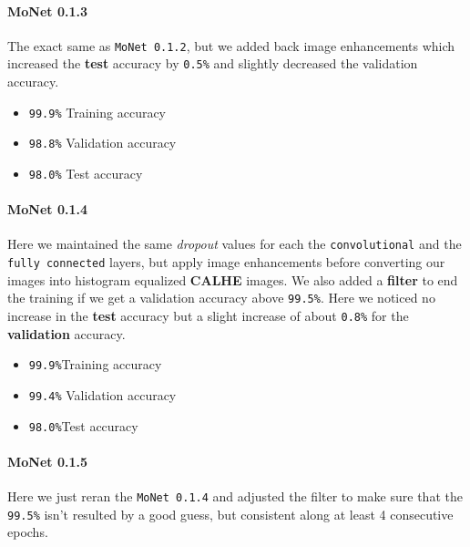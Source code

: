 \documentclass[11pt]{article}
\providecommand{\tightlist}{%
      \setlength{\itemsep}{0pt}\setlength{\parskip}{0pt}}
\begin{document}
\hypertarget{monet-0.1.3}{%
\paragraph{MoNet 0.1.3}\label{monet-0.1.3}}

The exact same as \texttt{MoNet\ 0.1.2}, but we added back image
enhancements which increased the \textbf{test} accuracy by
\texttt{0.5\%} and slightly decreased the validation accuracy.

\begin{itemize}
\tightlist
\item
  \texttt{99.9\%} Training accuracy
\item
  \texttt{98.8\%} Validation accuracy
\item
  \texttt{98.0\%} Test accuracy
\end{itemize}

\hypertarget{monet-0.1.4}{%
\paragraph{MoNet 0.1.4}\label{monet-0.1.4}}

Here we maintained the same \emph{dropout} values for each the
\texttt{convolutional} and the \texttt{fully\ connected} layers, but
apply image enhancements before converting our images into histogram
equalized \textbf{CALHE} images. We also added a \textbf{filter} to end
the training if we get a validation accuracy above \texttt{99.5\%}. Here
we noticed no increase in the \textbf{test} accuracy but a slight
increase of about \texttt{0.8\%} for the \textbf{validation} accuracy.

\begin{itemize}
\tightlist
\item
  \texttt{99.9\%}Training accuracy
\item
  \texttt{99.4\%} Validation accuracy
\item
  \texttt{98.0\%}Test accuracy
\end{itemize}

\hypertarget{monet-0.1.5}{%
\paragraph{MoNet 0.1.5}\label{monet-0.1.5}}

Here we just reran the \texttt{MoNet\ 0.1.4} and adjusted the filter to
make sure that the \texttt{99.5\%} isn't resulted by a good guess, but
consistent along at least 4 consecutive epochs.
\end{document}

